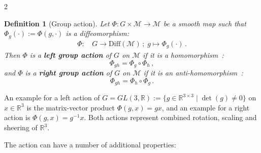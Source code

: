 \documentclass{article}
\newtheorem{definition}[theorem]{Definition}
\newcommand{\M}{\mathcal{M}}                                %
\newcommand{\R}{\mathbb{R}}                                 %
\newcommand{\state}{x}
\newcommand{\appstate}{\bar{x}}
\newcommand{\Diff}{\mathrm{Diff}}
\begin{document}
\begin{multicols}{2}
\begin{definition}[Group action]\label{def:group_action}
    Let $\Phi:G\times\M\rightarrow\M$ be a smooth map such that $\Phi_g(\cdot) := \Phi(g,\cdot)$ is a diffeomorphism:
    \begin{align}
        \Phi:&\, G \rightarrow \Diff(\M) \,;\;  g \mapsto \Phi_g(\cdot) \,.  
    \end{align}
    Then $\Phi$ is a \textbf{left group action} of $G$ on $\M$ if it is a homomorphism~\cite{Holm2009}: 
    \begin{equation}\label{eq:group_homomorphism}
        \Phi_{gh} = \Phi_g \circ \Phi_h \,, %
    \end{equation}
    and $\Phi$ is a \textbf{right group action} of $G$ on $\M$ if it is an anti-homomorphism~\cite{Holm2009}:
    \begin{equation}\label{eq:group_antihomomorphism}
        \Phi_{gh} = \Phi_h \circ \Phi_g\,.
    \end{equation}
\end{definition}

An example for a left action of $G = GL(3,\R) := \{g\in\R^{3\times 3} \;|\; \det(g) \neq 0\}$ on $x \in \R^3$ is the matrix-vector product $\Phi(g,x) = gx$, and an example for a right action is $\Phi(g,x) = g^{-1}x$. Both actions represent combined rotation, scaling and sheering of $\R^3$. 



The action can have a number of additional properties:



\end{multicols}
\end{document}
